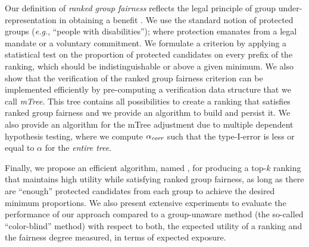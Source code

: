 Our definition of \emph{ranked group fairness} reflects the legal principle of group under-representation in obtaining a benefit \cite{ellis2012eu,lerner2003group}.
%
We use the standard notion of protected groups ({\em e.g.}, ``people with disabilities''); where protection emanates from a legal mandate or a voluntary commitment.
%
%
We formulate a criterion by applying a statistical test on the proportion of protected candidates on every prefix of the ranking, which should be indistinguishable or above a given minimum.
%
%
We also show that the verification of the ranked group fairness criterion can be implemented efficiently by pre-computing a verification data structure that we call \emph{mTree}.
%
This tree contains all possibilities to create a ranking that satisfies ranked group fairness and we provide an algorithm to build and persist it.
%
We also provide an algorithm \algoCorrect for the mTree adjustment due to multiple dependent hypothesis testing, where we compute $\alpha_\textit{corr}$ such that the type-I-error is less or equal to $\alpha$ for the \emph{entire tree}.
%

Finally, we propose an efficient algorithm, named \algoFAIR, for producing a top-$k$ ranking that maintains high utility while satisfying ranked group fairness, as long as there are ``enough'' protected candidates from each group to achieve the desired minimum proportions.
%
We also present extensive experiments to evaluate the performance of our approach compared to a group-unaware method (the so-called ``color-blind'' method) with respect to both, the expected utility of a ranking and the fairness degree measured, in terms of expected exposure.

\medskip

